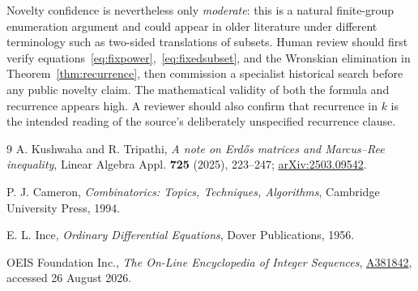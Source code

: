 \documentclass[11pt]{article}
\begin{document}
Novelty confidence is nevertheless only \emph{moderate}: this is a natural
finite-group enumeration argument and could appear in older literature under
different terminology such as two-sided translations of subsets. Human review
should first verify equations~\eqref{eq:fixpower},~\eqref{eq:fixedsubset},
and the Wronskian elimination in Theorem~\ref{thm:recurrence},
then commission a specialist historical search before any public novelty
claim. The mathematical validity of both the formula and recurrence appears
high. A reviewer should also confirm that recurrence in $k$ is the intended
reading of the source's deliberately unspecified recurrence clause.

\begin{thebibliography}{9}
A. Kushwaha and R. Tripathi,
\emph{A note on Erd\H{o}s matrices and Marcus--Ree inequality},
Linear Algebra Appl. \textbf{725} (2025), 223--247;
\href{https://arxiv.org/abs/2503.09542}{arXiv:2503.09542}.

P. J. Cameron,
\emph{Combinatorics: Topics, Techniques, Algorithms},
Cambridge University Press, 1994.

E. L. Ince,
\emph{Ordinary Differential Equations},
Dover Publications, 1956.

OEIS Foundation Inc.,
\emph{The On-Line Encyclopedia of Integer Sequences},
\href{https://oeis.org/A381842}{A381842}, accessed 26 August 2026.
\end{thebibliography}
\end{document}
